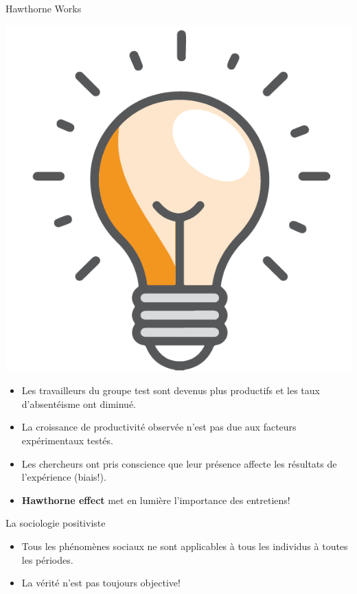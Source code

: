 \documentclass[10pt]{beamer}
\begin{document}
\begin{frame}{Hawthorne Works}

        \center\includegraphics[width=.3\textwidth]{light}
        \begin{itemize}
            \item<2->{Les travailleurs du groupe test sont devenus plus productifs et les taux d'absentéisme ont diminué.}
            \item<3->{La croissance de productivité observée n'est pas due aux facteurs expérimentaux testés.}
            \item<4->{Les chercheurs ont pris conscience que leur présence affecte les résultats de l'expérience (biais!).}
            \item<5->[\faLightbulb]\alert{\textbf{Hawthorne effect} met en lumière l'importance des entretiens!}
        \end{itemize}
\end{frame}

\begin{frame}{La sociologie positiviste}
    \begin{itemize}
        \item<3-> Tous les phénomènes sociaux ne sont applicables à tous les individus à toutes les périodes.
        \item<4-> La vérité n'est pas toujours objective!
    \end{itemize}
\end{frame}
\end{document}
